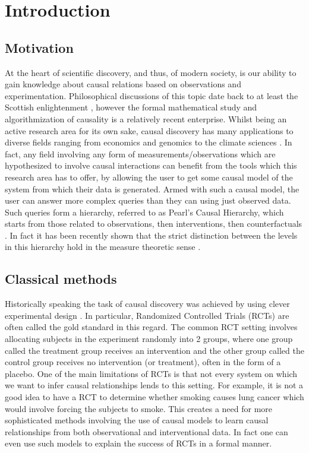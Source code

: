 \documentclass{tufte-book}
\begin{document}
\setcounter{tocdepth}{1}
\tableofcontents


\chapter{Introduction}
\label{sec:org88fd880}
\label{sec:Intro}
\section{Motivation}
\label{sec:org4ed49bd}
At the heart of scientific discovery, and thus, of modern society, is our ability to gain knowledge about causal relations based on observations and experimentation. Philosophical discussions of this topic date back to at least the Scottish enlightenment \cite{hume-1748-enquir-concer}, however the formal mathematical study and algorithmization of causality is a relatively recent enterprise. Whilst being an active research area for its own sake, causal discovery has many applications to diverse fields ranging from economics \cite{huenermund-2019-causal-infer} and genomics \cite{hu-2018-applic-causal} to the climate sciences \cite{runge-2019-infer-causat}. In fact, any field involving any form of measurements/observations which are hypothesized to involve causal interactions can benefit from the tools which this research area has to offer, by allowing the user to get some causal model of the system from which their data is generated. Armed with such a causal model, the user can answer more complex queries than they can using just observed data. Such queries form a hierarchy, referred to as Pearl's Causal Hierarchy, which starts from those related to observations, then interventions, then counterfactuals \cite{pearl-2018-book-why}.   In fact it has been recently shown that the strict distinction between the levels in this hierarchy hold in the measure theoretic sense \cite{elias-2020-pearl-hierar}.

\section{Classical methods}
\label{sec:org0a01061}
Historically speaking the task of causal discovery was achieved by using clever experimental design \cite{fisher-1935}. In particular, Randomized Controlled Trials (RCTs) are often called the gold standard in this regard. The common RCT setting involves allocating subjects in the experiment randomly into 2 groups, where one group called the treatment group receives an intervention and the other group called the control group receives no intervention (or treatment), often in the form of a placebo. One of the main limitations of RCTs is that not every system on which we want to infer causal relationships lends to this setting. For example, it is not a good idea to have a RCT to determine whether smoking causes lung cancer which would involve forcing the subjects to smoke. This creates a need for more sophisticated methods involving the use of causal models to learn causal relationships from both observational and interventional data. In fact one can even use such models to explain the success of RCTs in a formal manner.
\end{document}
